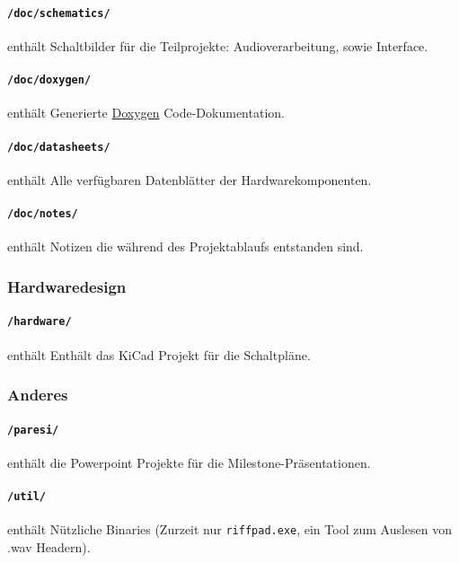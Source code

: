 \paragraph{\texttt{/doc/schematics/}} enthält Schaltbilder für die Teilprojekte: Audioverarbeitung, sowie Interface.

\paragraph{\texttt{/doc/doxygen/}} enthält Generierte \hyperlink{https://www.doxygen.nl/index.html}{Doxygen} Code-Dokumentation.

\paragraph{\texttt{/doc/datasheets/}} enthält Alle verfügbaren Datenblätter der Hardwarekomponenten.

\paragraph{\texttt{/doc/notes/}} enthält Notizen die während des Projektablaufs entstanden sind.

\subsubsection{Hardwaredesign}

\paragraph{\texttt{/hardware/}} enthält Enthält das KiCad Projekt für die Schaltpläne.

\subsubsection{Anderes}

\paragraph{\texttt{/paresi/}} enthält die Powerpoint Projekte für die Milestone-Präsentationen.

\paragraph{\texttt{/util/}} enthält Nützliche Binaries (Zurzeit nur \texttt{riffpad.exe}, ein Tool zum Auslesen von .wav Headern).


